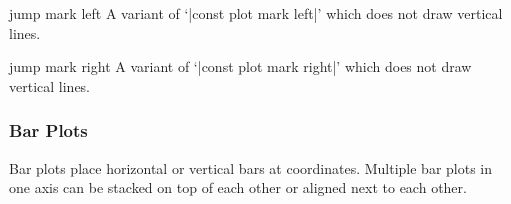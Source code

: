 \begin{plottype}{jump mark left}
A variant of `|const plot mark left|' which does not draw vertical lines.
\begin{codeexample}[]
\end{codeexample}
\end{plottype}

\begin{plottype}{jump mark right}
A variant of `|const plot mark right|' which does not draw vertical lines.
\end{plottype}

\subsubsection{Bar Plots}
Bar plots place horizontal or vertical bars at coordinates. Multiple bar plots in one axis can be stacked on top of each other or aligned next to each other.


